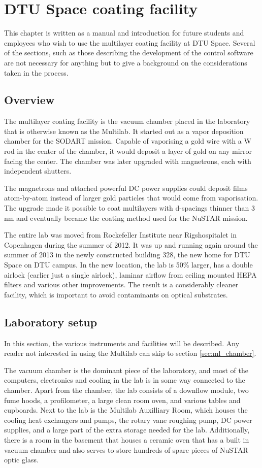 \chapter{DTU Space coating facility}
This chapter is written as a manual and introduction for future students and employees who wish to use the multilayer coating facility at DTU Space. Several of the sections, such as those describing the development of the control software are not necessary for anything but to give a background on the considerations taken in the process.

\section{Overview}
The multilayer coating facility is the vacuum chamber placed in the laboratory that is otherwise known as the Multilab. It started out as a vapor deposition chamber for the SODART mission. Capable of vaporising a gold wire with a W rod in the center of the chamber, it would deposit a layer of gold on any mirror facing the center. The chamber was later upgraded with magnetrons, each with independent shutters.

The magnetrons and attached powerful DC power supplies could deposit films atom-by-atom instead of larger gold particles that would come from vaporisation. The upgrade made it possible to coat multilayers with d-spacings thinner than 3 nm and eventually became the coating method used for the NuSTAR mission.

The entire lab was moved from Rockefeller Institute near Rigshospitalet in Copenhagen during the summer of 2012. It was up and running again around the summer of 2013 in the newly constructed building 328, the new home for DTU Space on DTU campus. In the new location, the lab is 50\% larger, has a double airlock (earlier just a single airlock), laminar airflow from ceiling mounted HEPA filters and various other improvements. The result is a considerably cleaner facility, which is important to avoid contaminants on optical substrates.

\section{Laboratory setup}
In this section, the various instruments and facilities will be described. Any reader not interested in using the Multilab can skip to section \ref{sec:ml_chamber}.

The vacuum chamber is the dominant piece of the laboratory, and most of the computers, electronics and cooling in the lab is in some way connected to the chamber. Apart from the chamber, the lab consists of a downflow module, two fume hoods, a profilometer, a large clean room oven, and various tables and cupboards. Next to the lab is the Multilab Auxilliary Room, which houses the cooling heat exchangers and pumps, the rotary vane roughing pump, DC power supplies, and a large part of the extra storage needed for the lab. Additionally, there is a room in the basement that houses a ceramic oven that has a built in vacuum chamber and also serves to store hundreds of spare pieces of NuSTAR optic glass. 

